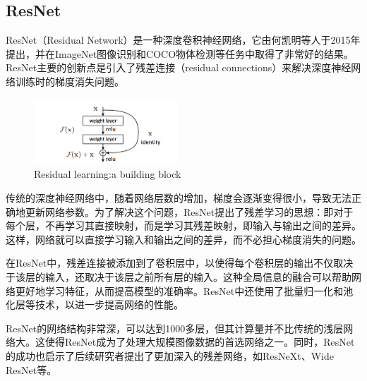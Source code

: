 \documentclass[10.5pt,a4paper]{article}%
\begin{document}
        \subsection{ResNet}
        ResNet（Residual Network）是一种深度卷积神经网络，它由何凯明等人于2015年提出\cite{He_2016_CVPR}，并在ImageNet\cite{imagenet}图像识别和COCO\cite{coco}物体检测等任务中取得了非常好的结果。ResNet主要的创新点是引入了残差连接（residual connections）来解决深度神经网络训练时的梯度消失问题。\par
        \begin{figure}[H]
        \centering
            \includegraphics[width=0.48\textwidth]{residual block.png}
          \caption{Residual learning:a building block\cite{He_2016_CVPR}}
          \label{fig:resnet}
        \end{figure}
        传统的深度神经网络中，随着网络层数的增加，梯度会逐渐变得很小，导致无法正确地更新网络参数。为了解决这个问题，ResNet提出了残差学习的思想：即对于每个层，不再学习其直接映射，而是学习其残差映射，即输入与输出之间的差异。这样，网络就可以直接学习输入和输出之间的差异，而不必担心梯度消失的问题。\par
        在ResNet中，残差连接被添加到了卷积层中，以使得每个卷积层的输出不仅取决于该层的输入，还取决于该层之前所有层的输入。这种全局信息的融合可以帮助网络更好地学习特征，从而提高模型的准确率。ResNet中还使用了批量归一化和池化层等技术，以进一步提高网络的性能。\par
        ResNet的网络结构非常深，可以达到1000多层，但其计算量并不比传统的浅层网络大。这使得ResNet成为了处理大规模图像数据的首选网络之一。同时，ResNet的成功也启示了后续研究者提出了更加深入的残差网络，如ResNeXt、Wide ResNet\cite{wideresnet}等。
\end{document}

